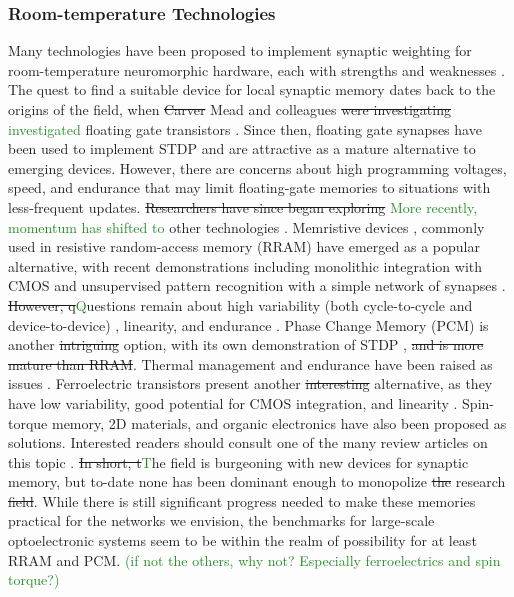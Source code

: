 \documentclass[twocolumn]{article}
\begin{document}
\subsubsection{Room-temperature Technologies}
Many technologies have been proposed to implement synaptic weighting for room-temperature neuromorphic hardware, each with strengths and weaknesses \cite{upadhyay2019emerging}. The quest to find a suitable device for local synaptic memory dates back to the origins of the field, when \sout{Carver} Mead and colleagues \sout{were investigating} \textcolor{ForestGreen}{investigated} floating gate transistors \cite{diorio1998floating}. Since then, floating gate synapses have been used to implement STDP \cite{ramakrishnan2011floating} and are attractive as a mature alternative to emerging devices. However, there are concerns about high programming voltages, speed, and endurance that may limit floating-gate memories to situations with less-frequent updates. \sout{Researchers have since began exploring} \textcolor{ForestGreen}{More recently, momentum has shifted to} other technologies \cite{zahoor2020resistive}.  Memristive devices \cite{stsn2008,yast2012,ab2018}, commonly used in resistive random-access memory (RRAM) have emerged as a popular alternative, with recent demonstrations including monolithic integration with CMOS \cite{yin2019monolithically} and unsupervised pattern recognition with a simple network of synapses \cite{ielmini2018brain}. \sout{However, q}\textcolor{ForestGreen}{Q}uestions remain about high variability (both cycle-to-cycle and device-to-device) \cite{dalgaty2019hybrid}, linearity, and endurance \cite{zahoor2020resistive}. Phase Change Memory (PCM) is another \sout{intriguing} option, with its own demonstration of STDP \cite{ambrogio2016unsupervised}, \sout{and is more mature than RRAM}. Thermal management and endurance have been raised as issues \cite{upadhyay2019emerging, zahoor2020resistive}. Ferroelectric transistors present another \sout{interesting} alternative, as they have low variability, good potential for CMOS integration, and linearity \cite{kim2019ferroelectric}.  Spin-torque memory, 2D materials, and organic electronics have also been proposed as solutions. Interested readers should consult one of the many review articles on this topic \cite{kim2018recent, upadhyay2019emerging, zhang2020brain}. \sout{In short, t}\textcolor{ForestGreen}{T}he field is burgeoning with new devices for synaptic memory, but to-date none has been dominant enough to monopolize \sout{the} research \sout{field}. While there is still significant progress needed to make these memories practical for the networks we envision, the benchmarks for large-scale optoelectronic systems seem to be within the realm of possibility for at least RRAM and PCM. \textcolor{ForestGreen}{(if not the others, why not? Especially ferroelectrics and spin torque?)}
\end{document}
